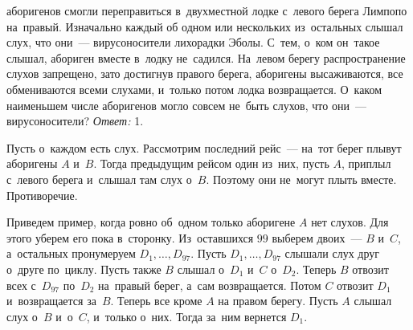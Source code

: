  аборигенов смогли переправиться в~двухместной лодке с~левого берега Лимпопо
на~правый.
Изначально каждый об одном или нескольких из~остальных слышал слух, что они~---
вирусоносители лихорадки Эболы.
С~тем, о~ком он~такое слышал, абориген вместе в~лодку не~садился.
На~левом берегу распространение слухов запрещено, зато достигнув правого
берега, аборигены высаживаются, все обмениваются всеми слухами, и~только потом
лодка возвращается.
О~каком наименьшем числе аборигенов могло совсем не~быть слухов, что они~---
вирусоносители?
\solution
\emph{Ответ:} 1.
\par
Пусть о~каждом есть слух.
Рассмотрим последний рейс~--- на~тот берег плывут аборигены $A$ и~$B$.
Тогда предыдущим рейсом один из~них, пусть $A$, приплыл с~левого берега
и~слышал там слух о~$B$.
Поэтому они не~могут плыть вместе.
Противоречие.
\par
Приведем пример, когда ровно об~одном только аборигене $A$ нет слухов.
Для этого уберем его пока в~сторонку.
Из~оставшихся $99$ выберем двоих~--- $B$ и~$C$, а~остальных пронумеруем
$D_{1}, \ldots, D_{97}$.
Пусть $D_{1}, \ldots, D_{97}$ слышали слух друг о~друге по~циклу.
Пусть также $B$ слышал о~$D_1$ и~$C$ о~$D_2$.
Теперь $B$ отвозит всех с~$D_{97}$ по~$D_2$ на~правый берег, а~сам
возвращается.
Потом $C$ отвозит $D_1$ и~возвращается за~$B$.
Теперь все кроме $A$ на правом берегу.
Пусть $A$ слышал слух о~$B$ и~о~$C$, и~только о~них.
Тогда за~ним вернется $D_1$.
\endproblem
